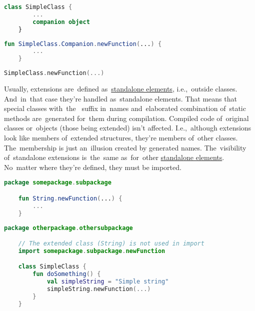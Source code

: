 \begin{lstlisting}[language=Kotlin, title={Class with a~companion object without a~body}]
    class SimpleClass {
        ...
        companion object
    }
\end{lstlisting}
\begin{lstlisting}[language=Kotlin, title={Companion object extension definition}]
    fun SimpleClass.Companion.newFunction(...) {
        ...
    }
\end{lstlisting}
\begin{lstlisting}[language=Kotlin, title={Usage}]
    SimpleClass.newFunction(...)
\end{lstlisting}

Usually, extensions are~defined as~\hyperref[kotlinstandalone]{standalone elements}, i.e.,~outside classes.
And~in~that case they're handled as~standalone elements.
That means that special classes \mbox{with the } suffix in~names and~elaborated combination of~static methods are~generated for~them during compilation.
Compiled code of~original classes or~objects (those being extended) isn't affected.
I.e.,~although extensions look like members of~extended structures, they're members of~other classes.
The~membership is just an~illusion created by generated names.
The~visibility of~standalone extensions is~the~same as~for~other \hyperref[kotlinstandalone]{standalone elements}.
No~matter where they're defined, they must be imported.

\begin{lstlisting}[language=Kotlin, title={Extension definition}]
    package somepackage.subpackage

    fun String.newFunction(...) {
        ...
    }
\end{lstlisting}
\begin{lstlisting}[language=Kotlin, title={Usage in a class}]
    package otherpackage.othersubpackage

    // The extended class (String) is not used in import
    import somepackage.subpackage.newFunction

    class SimpleClass {
        fun doSomething() {
            val simpleString = "Simple string"
            simpleString.newFunction(...)
        }
    }
\end{lstlisting}
\newline

